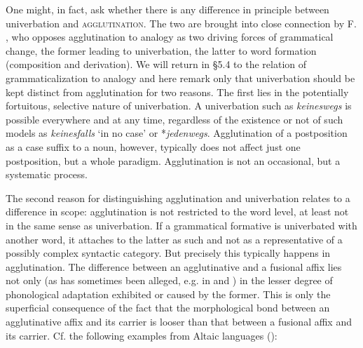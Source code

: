 One might, in fact, ask whether there is any difference in principle between univerbation and \textsc{agglutination}. The two are brought into close connection by F. \citet[Part 3, Ch. \textsc{vii}, §§1f]{Saussure1916}, who opposes agglutination to analogy as two driving forces of grammatical change, the former leading to univerbation, the latter to word formation (composition and derivation). We will return in §5.4 to the relation of grammaticalization to analogy and here remark only that univerbation should be kept distinct from agglutination for two reasons. The first lies in the potentially fortuitous, selective nature of univerbation. A univerbation such as \textit{keineswegs} is possible everywhere and at any time, regardless of the existence or not of such models as \textit{keinesfalls} ‘in no case’ or *\textit{jedenwegs}. Agglutination of a postposition as a case suffix to a noun, however, typically does not affect just one postposition, but a whole paradigm. Agglutination is not an occasional, but a systematic process.

The second reason for distinguishing agglutination and univerbation relates to a difference in scope: agglutination is not restricted to the word level, at least not in the same sense as univerbation. If a grammatical formative is univerbated with another word, it attaches to the latter as such and not as a representative of a possibly complex syntactic category. But precisely this typically happens in agglutination. The difference between an agglutinative and a fusional affix lies not only (as has sometimes been alleged, e.g. in \citealt[Ch.~V]{Sapir1921} and \citealt{Greenberg1954}) in the lesser degree of phonological adaptation exhibited or caused by the former. This is only the superficial consequence of the fact that the morphological bond between an agglutinative affix and its carrier is looser than that between a fusional affix and its carrier. Cf. the following examples from Altaic languages (\citealt[71]{Žirmunskij1966}):


